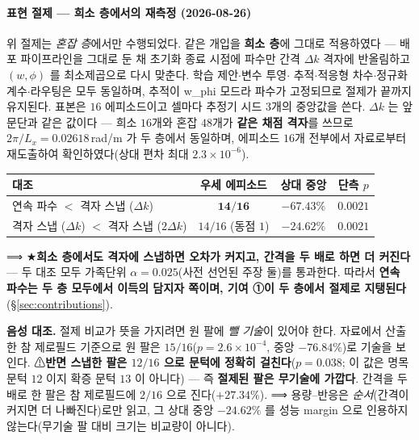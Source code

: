 \documentclass[11pt]{report}
\numberwithin{equation}{chapter}
\numberwithin{figure}{chapter}
\numberwithin{table}{chapter}
\begin{document}
\paragraph{표현 절제 --- 희소 층에서의 재측정 (2026-08-26)}
위 절제는 \emph{혼잡 층}에서만 수행되었다. 같은 개입을 \textbf{희소 층}에 그대로
적용하였다 --- 배포 파이프라인을 그대로 둔 채 초기화 종료 시점에 파수만 간격 $\Delta k$
격자에 반올림하고 $(w,\phi)$ 를 최소제곱으로 다시 맞춘다. 학습 제안$\cdot$변수 투영$\cdot$
추적$\cdot$적응형 차수$\cdot$정규화 계수$\cdot$라우팅은 모두 동일하며, 추적이 w\_phi
모드라 파수가 고정되므로 절제가 끝까지 유지된다. 표본은 $16$ 에피소드이고 셀마다
추정기 시드 $3$개의 중앙값을 쓴다. $\Delta k$ 는 앞 문단과 같은 값이다 --- 희소 $16$개와 혼잡 $48$개가 \textbf{같은 채점
격자}를 쓰므로 $2\pi/L_x = 0.02618$\,rad/m 가 두 층에서 동일하며, 에피소드 $16$개
전부에서 자료로부터 재도출하여 확인하였다(상대 편차 최대 $2.3\times10^{-6}$).

\begin{center}
\begin{tabular}{lccc}
\toprule
대조 & 우세 에피소드 & 상대 중앙 & 단측 $p$ \\
\midrule
연속 파수 $<$ 격자 스냅 ($\Delta k$) & $\mathbf{14/16}$ & $\mathbf{-67.43\%}$ & $\mathbf{0.0021}$ \\
격자 스냅 ($\Delta k$) $<$ 격자 스냅 ($2\Delta k$) & $14/16$ (동점 $1$) & $-24.62\%$ & $0.0021$ \\
\bottomrule
\end{tabular}
\end{center}

⟹ ★\textbf{희소 층에서도 격자에 스냅하면 오차가 커지고, 간격을 두 배로 하면 더 커진다}
--- 두 대조 모두 가족단위 $\alpha = 0.025$(사전 선언된 주장 둘)를 통과한다.
따라서 \textbf{연속 파수는 두 층 모두에서 이득의 담지자 쪽이며, 기여 ①이 두 층에서
절제로 지탱된다}(\S\ref{sec:contributions}).

\textbf{음성 대조.} 절제 비교가 뜻을 가지려면 원 팔에 \emph{뺄 기술}이 있어야 한다.
자료에서 산출한 참 제로필드 기준으로 원 팔은 $15/16$($p = 2.6\times10^{-4}$,
중앙 $-76.84\%$)로 기술을 보인다. ⚠\textbf{반면 스냅한 팔은 $12/16$ 으로 문턱에 정확히
걸친다}($p = 0.038$; 이 값은 명목 문턱 $12$ 이지 확증 문턱 $13$ 이 아니다) --- 즉
\textbf{절제된 팔은 무기술에 가깝다}. 간격을 두 배로 한 팔은 참 제로필드에 $2/16$ 으로
진다($+27.34\%$). ⟹ 용량--반응은 \emph{순서}(간격이 커지면 더 나빠진다)로만 읽고,
그 상대 중앙 $-24.62\%$ 를 성능 margin 으로 인용하지 않는다(무기술 팔 대비 크기는
비교량이 아니다).
\end{document}
